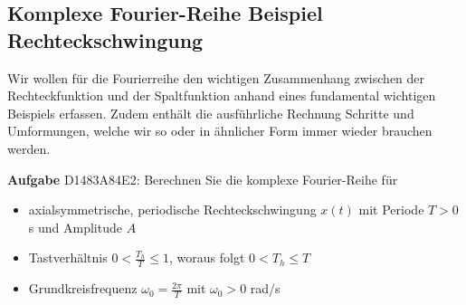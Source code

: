 \subsection{Komplexe Fourier-Reihe Beispiel Rechteckschwingung}
\label{sec:D1483A84E2}
%
\begin{Ziel}
Wir wollen für die Fourierreihe den wichtigen Zusammenhang zwischen der Rechteckfunktion
und der Spaltfunktion anhand eines fundamental wichtigen Beispiels erfassen. Zudem enthält die
ausführliche Rechnung Schritte und Umformungen, welche wir so oder in ähnlicher Form
immer wieder brauchen werden.
\end{Ziel}
\textbf{Aufgabe} {\tiny D1483A84E2}: Berechnen Sie die komplexe Fourier-Reihe für
\begin{itemize}
\item axialsymmetrische, periodische Rechteckschwingung $x(t)$ mit Periode $T>0$ s
und Amplitude $A$
\item Tastverhältnis $0<\frac{T_h}{T}\leq 1$, woraus folgt $0 < T_h \leq T$
\item Grundkreisfrequenz $\omega_0 = \frac{2\pi}{T}$ mit $\omega_0>0$ rad/s
\end{itemize}
%
\begin{figure}[h!]
\centering
{}
\end{figure}
%
